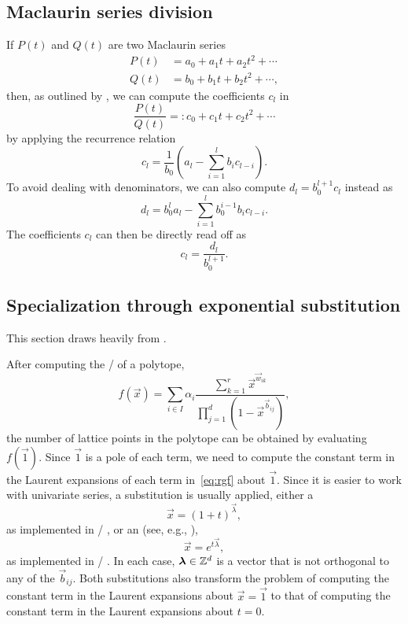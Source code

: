 \subsection{Maclaurin series division}
\label{s:division}

If $P(t)$ and $Q(t)$ are two Maclaurin series
\begin{align*}
P(t) & =  a_0 + a_1 t + a_2 t^2 + \cdots \\
Q(t) & =  b_0 + b_1 t + b_2 t^2 + \cdots
,
\end{align*}
then, as outlined by ,
we can compute the coefficients $c_l$ in
$$
\frac{P(t)}{Q(t)} =: c_0 + c_1 t + c_2 t^2 + \cdots
$$
by applying the recurrence relation
$$
c_l = \frac 1 {b_0} \left( a_l - \sum_{i=1}^l b_i c_{l-i} \right)
.
$$
To avoid dealing with denominators, we can also compute
$d_l = b_0^{l+1} c_l$ instead as
$$
d_l = b_0^l a_l - \sum_{i=1}^l b_0^{i-1} b_i c_{l-i}
.
$$
The coefficients $c_l$ can then be directly read off as
$$
c_l = \frac{d_l}{b_0^{l+1}}
.
$$

\subsection{Specialization through exponential substitution}

This section draws heavily from .

After computing the \rgf/ of a polytope,
\begin{equation}
\label{eq:rgf}
f(\vec x)=
\sum_{i\in I}\alpha_i
    \frac{\sum_{k=1}^{r} \vec x^{\vec w_{ik} }}
	 {\prod_{j=1}^{d}\left(1-\vec x^{\vec b_{ij}}\right)}
,
\end{equation}
the number of lattice points in the polytope can be obtained
by evaluating $f(\vec 1)$.  Since $\vec 1$ is a pole of each
term, we need to compute the constant term in the Laurent expansions
of each term in~\eqref{eq:rgf} about $\vec 1$.
Since it is easier to work with univariate series, a substitution is usually
applied, either a 
$$
\vec x = (1+t)^{\vec \lambda}
,
$$
as implemented in \LattE/ ,
or an  (see, e.g., ),
$$
\vec x = e^{t \vec \lambda}
,
$$
as implemented in \LattEmk/ .
In each case, $\vec \lambda \in \ZZ^d$ is a vector that is not orthogonal
to any of the $\vec b_{ij}$.
Both substitutions also transform the problem of computing the
constant term in the Laurent expansions about $\vec x = \vec 1$
to that of computing the constant term in the
Laurent expansions about $t = 0$.

